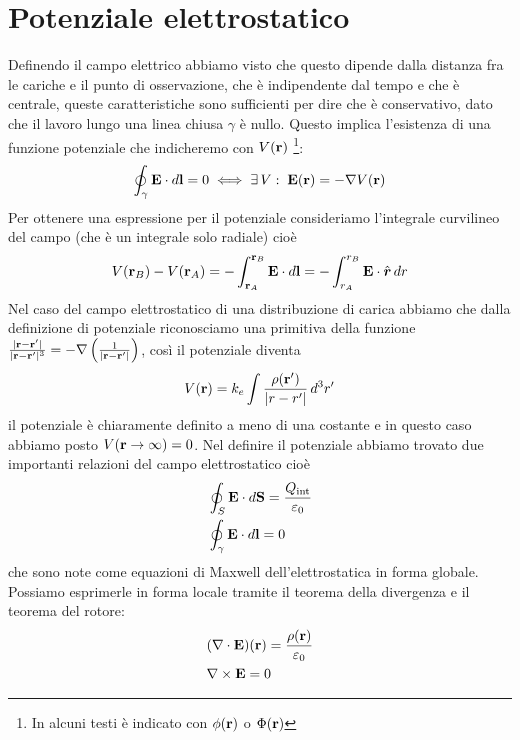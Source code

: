 \section{Potenziale elettrostatico}
Definendo il campo elettrico abbiamo visto che questo dipende dalla distanza fra le cariche e il punto di osservazione, che è indipendente dal tempo e 
che è centrale, queste caratteristiche sono sufficienti per dire che è conservativo, dato che il lavoro lungo una linea chiusa $ \gamma $ è nullo. Questo 
implica l'esistenza di una funzione potenziale che indicheremo con $ V(\mathbf{r}) $ \footnote{In alcuni testi è indicato con $ \phi(\mathbf{r}) $ o $ \Phi(\mathbf{r}) $}:
\begin{align}
  \oint_\gamma \mathbf{E} \cdot d\mathbf{l} = 0 \iff \exists\,V:\;\mathbf{E(r)} = - \nabla V(\mathbf{r})
\end{align}
Per ottenere una espressione per il potenziale consideriamo l'integrale curvilineo del campo (che è un integrale solo radiale) cioè
\begin{align}
  V(\mathbf{r}_B) - V(\mathbf{r}_A) = - \int_{\mathbf{r}_A}^{\mathbf{r}_B} \mathbf{E} \cdot d\mathbf{l} = - \int_{r_A}^{r_B} \mathbf{E} \cdot \hat{\boldsymbol{r}} \,dr
\end{align}
Nel caso del campo elettrostatico di una distribuzione di carica abbiamo che dalla definizione di potenziale riconosciamo una primitiva della funzione 
$ \frac{|\mathbf{r - r'}|}{|\mathbf{r - r'}|^3} = - \nabla \left( \frac{1}{|\mathbf{r - r'}|} \right) $, così il potenziale diventa
\begin{align} \label{eq:_potenziale_elettrostatico}
  V(\mathbf{r}) = k_e \int \frac{\rho(\mathbf{r'})}{|r - r'|} \,d^3r'
\end{align}
il potenziale è chiaramente definito a meno di una costante e in questo caso abbiamo posto $ V(\mathbf{r} \to \infty) = 0 $.
Nel definire il potenziale abbiamo trovato due importanti relazioni del campo elettrostatico cioè
\begin{align}
  &\oint_S \mathbf{E} \cdot d\mathbf{S} = \frac{Q_{\text{int}}}{\varepsilon_0}
  \\
  &\oint_\gamma \mathbf{E} \cdot d\mathbf{l} = 0
\end{align}
che sono note come equazioni di Maxwell dell'elettrostatica in forma globale. Possiamo esprimerle in forma locale tramite il teorema della divergenza e il 
teorema del rotore:
\begin{align}
  &(\nabla \cdot \mathbf{E})(\mathbf{r}) = \frac{\rho(\mathbf{r})}{\varepsilon_0}
  \\
  &\nabla \times \mathbf{E} = 0 
\end{align}

